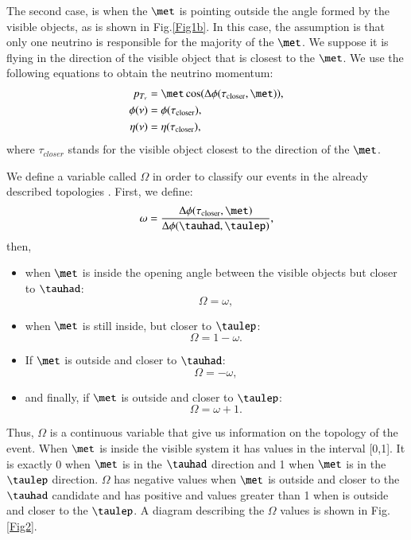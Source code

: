 The second case, is when the $\met$ is pointing outside the angle formed by the visible objects, as is shown in Fig.\ref{Fig1b}. In this case, the assumption is that only one neutrino is responsible for the majority of the $\met$. We suppose it is flying in the direction of the visible object that is closest to the $\met$. We use the following equations to obtain the neutrino momentum:
\begin{align}
	p_{T_{\nu}}&=\met \cos(\Delta\phi(\tau_{\text{closer}},\met)),
	\\
	\phi(\nu)&=\phi(\tau_{\text{closer}}),
	\\
	\eta(\nu)&=\eta(\tau_{\text{closer}}),
\end{align} 
where $\tau_{closer}$ stands for the visible object closest to the direction of the $\met$.

We define a variable called $\Omega$ in order to classify our events in the already described topologies . First, we define:
\begin{equation}
\omega=\frac{\Delta\phi(\tau_{\text{closer}},\met)}{\Delta\phi(\tauhad,\taulep)},
\end{equation}
then,
\begin{itemize}
	\item when $\met$ is inside the opening angle between the visible objects but closer to $\tauhad$:
	\begin{equation}
	\Omega=\omega,
	\end{equation}
	\item when $\met$ is still inside, but closer to $\taulep$:
	\begin{equation}
	\Omega=1-\omega.
	\end{equation}
	\item If $\met$ is outside and closer to $\tauhad$:
	\begin{equation}
	\Omega=-\omega,
	\end{equation}
	\item and finally, if $\met$ is outside and closer to $\taulep$:
	\begin{equation}
	\Omega=\omega+1.
	\end{equation}
\end{itemize}
Thus, $\Omega$ is a continuous variable that give us information on the topology of the event. When $\met$ is inside the visible system it has values in the interval [0,1]. It is exactly 0 when $\met$ is in the $\tauhad$ direction and 1 when $\met$ is in the $\taulep$ direction. $\Omega$ has negative values when $\met$ is outside and closer to the $\tauhad$ candidate and has positive and values greater than 1 when is outside and closer to the $\taulep$. A diagram describing the $\Omega$ values is shown in Fig.\ref{Fig2}.

